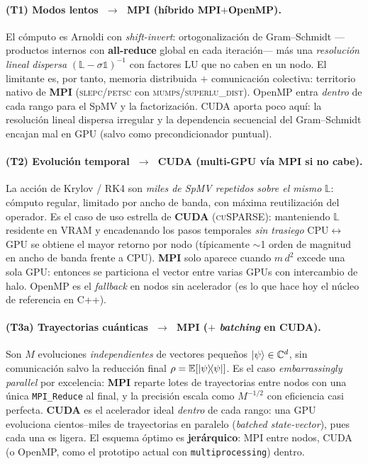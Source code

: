 \documentclass[11pt,a4paper]{article}
\theoremstyle{definition}
\theoremstyle{plain}
\begin{document}
\paragraph{(T1) Modos lentos $\;\to\;$ MPI (híbrido MPI${+}$OpenMP).}
El cómputo es Arnoldi con \emph{shift-invert}: ortogonalización de Gram--Schmidt
---productos internos con \textbf{all-reduce} global en cada iteración--- más una
\emph{resolución lineal dispersa} $(\mathbb{L}-\sigma\mathbb{1})^{-1}$ con factores
LU que no caben en un nodo. El limitante es, por tanto, memoria distribuida ${+}$
comunicación colectiva: territorio nativo de \textbf{MPI} (\textsc{slepc/petsc}
con \textsc{mumps}/\textsc{superlu\_dist}). OpenMP entra \emph{dentro} de cada
rango para el SpMV y la factorización. CUDA aporta poco aquí: la resolución
lineal dispersa irregular y la dependencia secuencial del Gram--Schmidt encajan
mal en GPU (salvo como precondicionador puntual).

\paragraph{(T2) Evolución temporal $\;\to\;$ CUDA (multi-GPU vía MPI si no cabe).}
La acción de Krylov / RK4 son \emph{miles de SpMV repetidos sobre el mismo}
$\mathbb{L}$: cómputo regular, limitado por ancho de banda, con máxima
reutilización del operador. Es el caso de uso estrella de \textbf{CUDA}
(\textsc{cuSPARSE}): manteniendo $\mathbb{L}$ residente en VRAM y encadenando los
pasos temporales \emph{sin trasiego} CPU$\leftrightarrow$GPU se obtiene el mayor
retorno por nodo (típicamente ${\sim}$1 orden de magnitud en ancho de banda
frente a CPU). \textbf{MPI} solo aparece cuando $m\,d^2$ excede una sola GPU:
entonces se particiona el vector entre varias GPUs con intercambio de halo.
OpenMP es el \emph{fallback} en nodos sin acelerador (es lo que hace hoy el
núcleo de referencia en C++).

\paragraph{(T3a) Trayectorias cuánticas $\;\to\;$ MPI (${+}$ \emph{batching} en CUDA).}
Son $M$ evoluciones \emph{independientes} de vectores pequeños
$\ket{\psi}\in\mathbb{C}^{d}$, sin comunicación salvo la reducción final
$\rho=\mathbb{E}[\dyad{\psi}{\psi}]$. Es el caso \emph{embarrassingly parallel}
por excelencia: \textbf{MPI} reparte lotes de trayectorias entre nodos con una
única \texttt{MPI\_Reduce} al final, y la precisión escala como $M^{-1/2}$ con
eficiencia casi perfecta. \textbf{CUDA} es el acelerador ideal \emph{dentro} de
cada rango: una GPU evoluciona cientos--miles de trayectorias en paralelo
(\emph{batched state-vector}), pues cada una es ligera. El esquema óptimo es
\textbf{jerárquico}: MPI entre nodos, CUDA (o OpenMP, como el prototipo actual con
\texttt{multiprocessing}) dentro.
\end{document}
